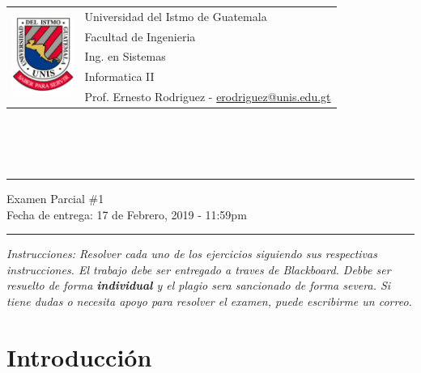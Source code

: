 \documentclass{article}
\newcommand{\horrule}[1]{\rule{\linewidth}{#1}}
\begin{document}
\begin{tabular}{l l}
\multirow{5}{*}{\includegraphics[width=2cm]{../../recursos/logo.png}} & Universidad del Istmo de Guatemala \\
 & Facultad de Ingenieria \\
 & Ing. en Sistemas \\
 & Informatica II \\
 & Prof. Ernesto Rodriguez - \href{mailto:erodriguez@unis.edu.gt}{erodriguez@unis.edu.gt} \\
\end{tabular}
\\\\\\

\begin{center}
        \horrule{0.5pt}
        \huge{Examen Parcial \#1} \\
        \large{Fecha de entrega: 17 de Febrero, 2019 - 11:59pm} \\
        \horrule{1pt}
\end{center}

\emph{Instrucciones: Resolver cada uno de los ejercicios siguiendo sus respectivas
instrucciones. El trabajo debe ser entregado a traves de Blackboard. Debbe ser resuelto de
forma {\bf individual} y el plagio sera sancionado de forma severa. Si tiene dudas o necesita
apoyo para resolver el examen, puede escribirme un correo.}

\section*{Introducci\'on}
\end{document}
